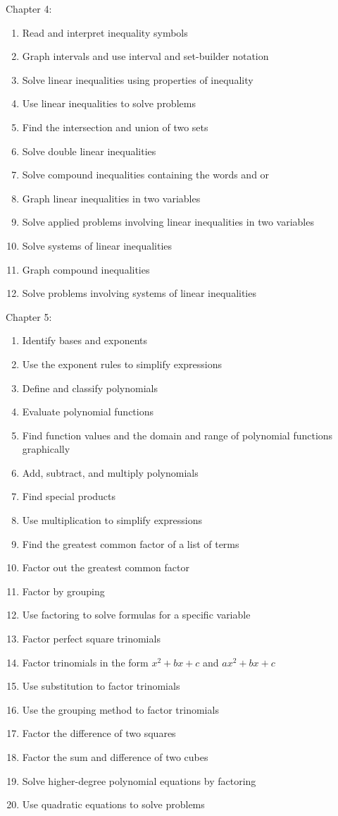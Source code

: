 \documentclass[11pt]{article}
\newenvironment{alphalist}{
\begin{enumerate}[label=(\arabic*),widest=107 ,leftmargin=25pt, itemsep=0pt]}
{\end{enumerate}}
\begin{document}
\noindent Chapter 4:
\begin{alphalist}
    \item Read and interpret inequality symbols
    \item Graph intervals and use interval and set-builder notation
    \item Solve linear inequalities using properties of inequality
    \item Use linear inequalities to solve problems
    \item Find the intersection and union of two sets
    \item Solve double linear inequalities
    \item Solve compound inequalities containing the words and or
    \item Graph linear inequalities in two variables
    \item Solve applied problems involving linear inequalities in two variables
    \item Solve systems of linear inequalities
    \item Graph compound inequalities
    \item Solve problems involving systems of linear inequalities
\end{alphalist}
\noindent Chapter 5:
\begin{alphalist}
    \item Identify bases and exponents
    \item Use the exponent rules to simplify expressions
    \item Define and classify polynomials
    \item Evaluate polynomial functions
    \item Find function values and the domain and range of polynomial functions graphically
    \item Add, subtract, and multiply polynomials
    \item Find special products
    \item Use multiplication to simplify expressions
    \item Find the greatest common factor of a list of terms
    \item Factor out the greatest common factor
    \item Factor by grouping
    \item Use factoring to solve formulas for a specific variable
    \item Factor perfect square trinomials
    \item Factor trinomials in the form $x^2 + bx + c$ and $ax^2 + bx + c$
    \item Use substitution to factor trinomials
    \item Use the grouping method to factor trinomials
    \item Factor the difference of two squares
    \item Factor the sum and difference of two cubes
    \item Solve higher-degree polynomial equations by factoring
    \item Use quadratic equations to solve problems
\end{alphalist}
 
\end{document}
